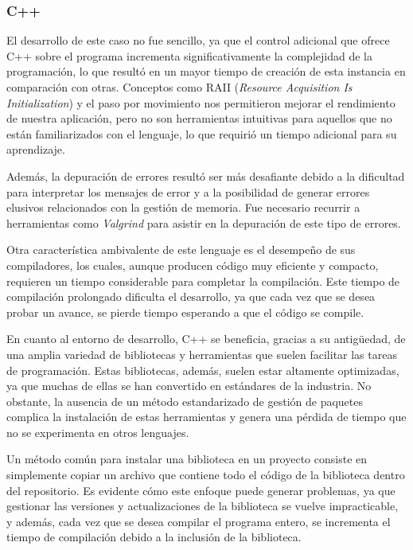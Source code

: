 \documentclass[11pt]{article}
\let\Oldsubsubsection\subsubsection
\renewcommand{\subsubsection}{\FloatBarrier\Oldsubsubsection}
\begin{document}
\subsubsection{C++}


El desarrollo de este caso no fue sencillo, ya que el control adicional que ofrece C++ sobre el programa incrementa significativamente la complejidad de la programación, lo que resultó en un mayor tiempo de creación de esta instancia en comparación con otras. Conceptos como RAII (\textit{Resource Acquisition Is Initialization}) \cite{cpp:doc:raii} y el paso por movimiento nos permitieron mejorar el rendimiento de nuestra aplicación, pero no son herramientas intuitivas para aquellos que no están familiarizados con el lenguaje, lo que requirió un tiempo adicional para su aprendizaje.

Además, la depuración de errores resultó ser más desafiante debido a la dificultad para interpretar los mensajes de error y a la posibilidad de generar errores elusivos relacionados con la gestión de memoria. Fue necesario recurrir a herramientas como \textit{Valgrind} \cite{cpp:lib:valgrind} para asistir en la depuración de este tipo de errores.

Otra característica ambivalente de este lenguaje es el desempeño de sus compiladores, los cuales, aunque producen código muy eficiente y compacto, requieren un tiempo considerable para completar la compilación. Este tiempo de compilación prolongado dificulta el desarrollo, ya que cada vez que se desea probar un avance, se pierde tiempo esperando a que el código se compile.

En cuanto al entorno de desarrollo, C++ se beneficia, gracias a su antigüedad, de una amplia variedad de bibliotecas y herramientas que suelen facilitar las tareas de programación. Estas bibliotecas, además, suelen estar altamente optimizadas, ya que muchas de ellas se han convertido en estándares de la industria. No obstante, la ausencia de un método estandarizado de gestión de paquetes complica la instalación de estas herramientas y genera una pérdida de tiempo que no se experimenta en otros lenguajes.

Un método común para instalar una biblioteca en un proyecto consiste en simplemente copiar un archivo que contiene todo el código de la biblioteca dentro del repositorio. Es evidente cómo este enfoque puede generar problemas, ya que gestionar las versiones y actualizaciones de la biblioteca se vuelve impracticable, y además, cada vez que se desea compilar el programa entero, se incrementa el tiempo de compilación debido a la inclusión de la biblioteca.
\end{document}
